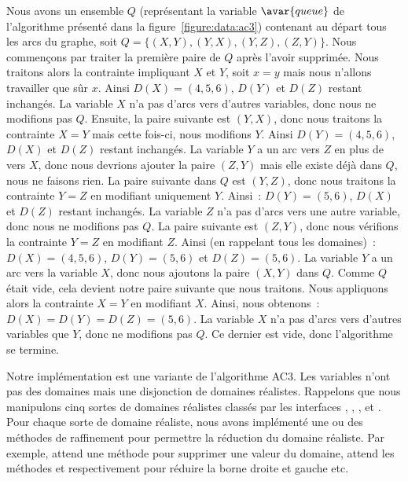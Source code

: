 \begin{example}
Nous avons un ensemble $Q$ (représentant la variable $\avar{queue}$ de
l'algorithme présenté dans la figure~\ref{figure:data:ac3}) contenant au départ
tous les arcs du graphe, soit $Q = \{(X, Y), (Y, X), (Y, Z), (Z, Y)\}$. Nous
commençons par traiter la première paire de $Q$ après l'avoir supprimée. Nous
traitons alors la contrainte impliquant $X$ et $Y$, soit $x = y$ mais nous
n'allons travailler que sûr $x$.  Ainsi $D(X) = (4, 5, 6)$, $D(Y)$ et $D(Z)$
restant inchangés. La variable $X$ n'a pas d'arcs vers d'autres variables, donc
nous ne modifions pas $Q$. Ensuite, la paire suivante est $(Y, X)$, donc nous
traitons la contrainte $X = Y$ mais cette fois-ci, nous modifions $Y$. Ainsi
$D(Y) = (4, 5, 6)$, $D(X)$ et $D(Z)$ restant inchangés. La variable $Y$ a un arc
vers $Z$ en plus de vers $X$, donc nous devrions ajouter la paire $(Z, Y)$ mais
elle existe déjà dans $Q$, nous ne faisons rien. La paire suivante dans $Q$ est
$(Y, Z)$, donc nous traitons la contrainte $Y = Z$ en modifiant uniquement $Y$.
Ainsi~: $D(Y) = (5, 6)$, $D(X)$ et $D(Z)$ restant inchangés. La variable $Z$ n'a
pas d'arcs vers une autre variable, donc nous ne modifions pas $Q$. La paire
suivante est $(Z, Y)$, donc nous vérifions la contrainte $Y = Z$ en modifiant
$Z$. Ainsi (en rappelant tous les domaines)~: $D(X) = (4, 5, 6)$, $D(Y) = (5,
6)$ et $D(Z) = (5, 6)$. La variable $Y$ a un arc vers la variable $X$, donc nous
ajoutons la paire $(X, Y)$ dans $Q$. Comme $Q$ était vide, cela devient notre
paire suivante que nous traitons. Nous appliquons alors la contrainte $X = Y$ en
modifiant $X$. Ainsi, nous obtenons~: $D(X) = D(Y) = D(Z) = (5, 6)$. La variable
$X$ n'a pas d'arcs vers d'autres variables que $Y$, donc ne modifions pas $Q$.
Ce dernier est vide, donc l'algorithme se termine.

\end{example}

Notre implémentation est une variante de l'algorithme AC3. Les variables n'ont
pas des domaines mais une disjonction de domaines réalistes. Rappelons que nous
manipulons cinq sortes de domaines réalistes classés par les interfaces
, , ,  et
. Pour chaque sorte de domaine réaliste, nous avons implémenté
une ou des méthodes de raffinement pour permettre la réduction du domaine
réaliste. Par exemple,  attend une méthode  pour
supprimer une valeur du domaine,  attend les méthodes
 et  respectivement pour réduire la borne
droite et gauche etc.

